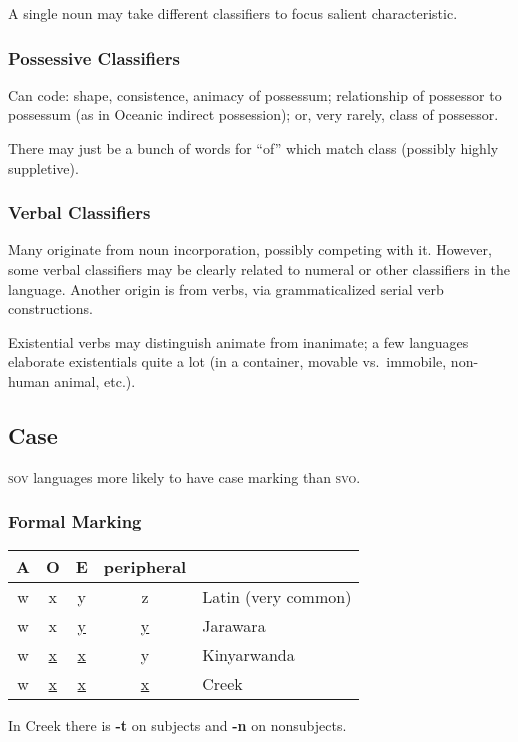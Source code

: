 \documentclass[11pt]{article}
\newcommand{\LL}[1]{\textbf{#1}}  %
\newcommand{\I}[1]{\textsc{#1}}   %
\begin{document}
A single noun may take different classifiers to focus salient
characteristic.

\subsubsection{Possessive Classifiers}
Can code: shape, consistence, animacy of possessum; relationship of
possessor to possessum (as in Oceanic indirect possession); or, very
rarely, class of possessor.

There may just be a bunch of words for ``of'' which match class
(possibly highly suppletive).

\subsubsection{Verbal Classifiers} 
Many originate from noun incorporation, possibly competing with it.
However, some verbal classifiers may be clearly related to numeral or
other classifiers in the language.  Another origin is from verbs, via
grammaticalized serial verb constructions.

Existential verbs may distinguish animate from inanimate; a few
languages elaborate existentials quite a lot (in a container, movable
vs.\ immobile, non-human animal, etc.).


\subsection{Case}
\I{sov} languages more likely to have case marking than \I{svo}.

\subsubsection{Formal Marking}
\begin{center}
  \begin{tabular}{ccccl}
    A & O & E & peripheral \\
    \hline
    w & x & y & z & Latin (very common) \\
    w & x & \uline{y} & \uline{y} & Jarawara \\
    w & \uline{x} & \uline{x} & y & Kinyarwanda \\
    w & \uline{x} & \uline{x} & \uline{x} & Creek
  \end{tabular}
\end{center}

\noindent In Creek there is \LL{-t} on subjects and \LL{-n} on
nonsubjects. 
\end{document}
